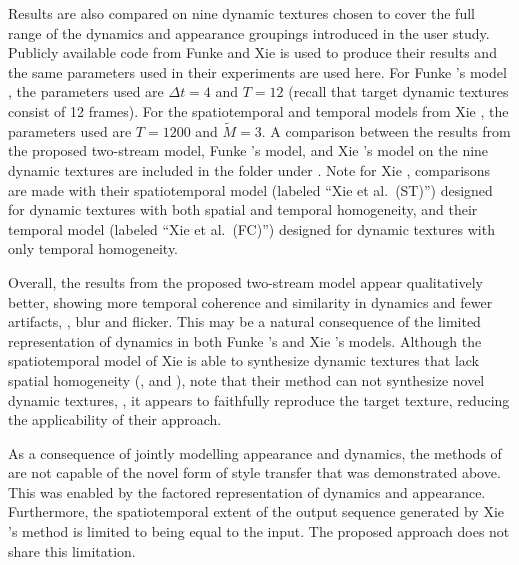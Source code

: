 Results are also compared on nine dynamic textures chosen to cover the full
range of the dynamics and appearance groupings introduced in the user study.
Publicly available code from Funke \etal and Xie \etal is used to produce their
results and the same parameters used in their experiments are used here. For
Funke \etal's model \cite{funke2017}, the parameters used are $\Delta{t}=4$ and
$T=12$  (recall that target dynamic textures
consist of 12 frames). For the spatiotemporal and temporal models from Xie
\etal \cite{xie2017synthesizing}, the parameters used are $T=1200$ and
$\tilde{M}=3$. 
A comparison between the results from the proposed two-stream model, Funke
\etal's \cite{funke2017} model, and Xie \etal's \cite{xie2017synthesizing} model
on the nine dynamic textures are included in the folder 
under . 
Note for Xie \etal \cite{xie2017synthesizing}, comparisons are made with their
spatiotemporal model (labeled ``Xie et al.\ (ST)'') designed for dynamic
textures with both spatial and temporal homogeneity, and their temporal model
(labeled ``Xie et al.\ (FC)'') designed for dynamic textures with only temporal
homogeneity.

Overall, the results from the proposed two-stream model appear
qualitatively better, showing more temporal coherence and similarity
in dynamics and fewer artifacts, \eg, blur and flicker.
This may be a natural consequence of the limited representation of dynamics
in both Funke \etal's and Xie \etal's models. Although the spatiotemporal model
of Xie \etal \cite{xie2017synthesizing} is able to synthesize dynamic textures
that lack spatial homogeneity (\eg,  and ),
note that their method can not synthesize novel dynamic textures, \ie, it
appears to faithfully reproduce the target texture, reducing the applicability
of their approach.

As a consequence of jointly modelling appearance and dynamics, the methods of
\cite{funke2017,xie2017synthesizing} are not capable of the novel form of style
transfer that was demonstrated above. This was enabled by the factored
representation of dynamics and appearance. Furthermore, the spatiotemporal
extent of the output sequence generated by Xie \etal's
\cite{xie2017synthesizing} method is limited to being equal to the input.
The proposed approach does not share this limitation.